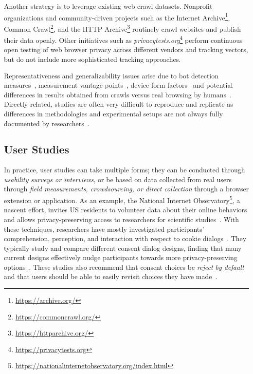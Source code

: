 Another strategy is to leverage existing web crawl datasets. Nonprofit organizations and community-driven projects such as the Internet Archive\footnote{\url{https://archive.org/}}, Common Crawl\footnote{\url{https://commoncrawl.org/}}, and the HTTP Archive\footnote{\url{https://httparchive.org/}} routinely crawl websites and publish their data openly. Other initiatives such as \textit{privacytests.org}\footnote{\url{https://privacytests.org}} perform continuous open testing of web browser privacy across different vendors and tracking vectors, but do not include more sophisticated tracking approaches. 

 Representativeness and generalizability issues arise due to 
bot detection measures~\cite{krumnowHowGullibleAre2022},
measurement vantage points~\cite{samarasingheGlobalPerspectiveWeb2019},
device form factors~\cite{yangComparativeMeasurementStudy2020,casselOmniCrawlComprehensiveMeasurement2022}
and potential differences in results obtained from crawls versus real browsing by humans~\cite{zeberRepresentativenessAutomatedWeb2020}. Directly related, studies are often very difficult to reproduce and replicate as differences in methodologies and experimental setups are not always fully documented by researchers~\cite{demirReproducibilityReplicabilityWeb2022,hantkeWebExecutionBundles2025}.


\subsection{User Studies}
\label{sec:user-studies}

In practice, user studies can take multiple forms; they can be conducted through \textit{usability surveys or interviews}, or be based on data collected from real users through \textit{field measurements, crowdsourcing, or direct collection} through a browser extension or application. As an example, the National Internet Observatory\footnote{\url{https://nationalinternetobservatory.org/index.html}}, a nascent effort, invites US residents to volunteer data about their online behaviors and allows privacy-preserving access to researchers for scientific studies~\cite{steningUnprecedentedDataCollection2022,callahanCanWeBetter2021,fealIntroductionNationalInternet2024}.
%
With these techniques, researchers have mostly investigated participants’ comprehension, perception, and interaction with respect to cookie  dialogs~\cite{birrellSoKTechnicalImplementation2024,machuletzMultiplePurposesMultiple2020,bermejofernandezThisWebsiteUses2021,habibOkayWhateverEvaluation2022,singhWhatCookieConsent2022,bielovaSurveyAcademicStudies2022,Bielova2024-zr}. They typically study and compare different consent dialog designs, finding that many current designs effectively nudge participants towards more privacy-preserving options~\cite{machuletzMultiplePurposesMultiple2020,bermejofernandezThisWebsiteUses2021}. These studies also recommend that consent choices be \textit{reject by default} and that users should be able to easily revisit choices they have made~\cite{habibOkayWhateverEvaluation2022,Kanc-etal-25-PETs}.


